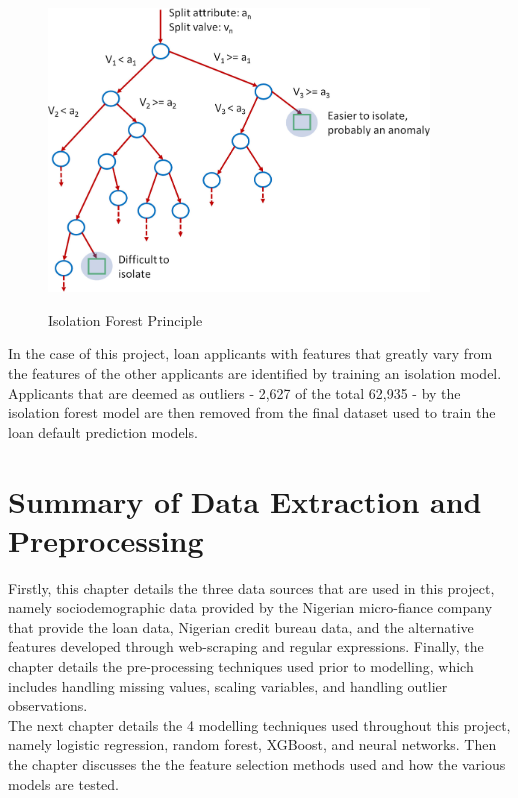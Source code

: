 \vspace{10pt}

\begin{figure}[!htb]
\centering
\includegraphics[width=0.9\textwidth]{images/isolation_tree.jpg}
\caption{Isolation Forest Principle}
\label{fig:isolation}
\parencite{Outlier1}
\end{figure}

\vspace{10pt}

In the case of this project, loan applicants with features that greatly vary from the features of the other applicants are identified by training an isolation model. Applicants that are deemed as outliers - 2,627 of the total 62,935 - by the isolation forest model are then removed from the final dataset used to train the loan default prediction models. \\


\section{Summary of Data Extraction and Preprocessing}

Firstly, this chapter details the three data sources that are used in this project, namely sociodemographic data provided by the Nigerian micro-fiance company that provide the loan data, Nigerian credit bureau data, and the alternative features developed through web-scraping and regular expressions. Finally, the chapter details the pre-processing techniques used prior to modelling, which includes handling missing values, scaling variables, and handling outlier observations. \\

The next chapter details the 4 modelling techniques used throughout this project, namely logistic regression, random forest, XGBoost, and neural networks. Then the chapter discusses the the feature selection methods used and how the various models are tested.  